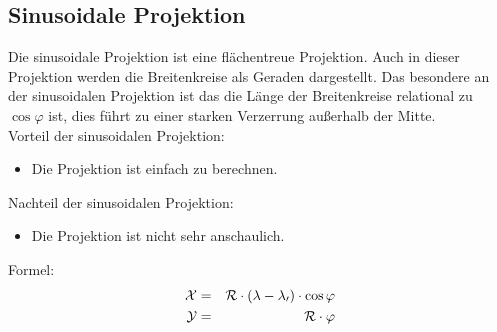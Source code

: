 \subsection{Sinusoidale Projektion}
\label{sec:sinusodial}
Die sinusoidale Projektion ist eine flächentreue Projektion. Auch in dieser Projektion werden die Breitenkreise als Geraden dargestellt. Das besondere an der sinusoidalen Projektion ist das die Länge der Breitenkreise relational zu $\cos\varphi$ ist, dies führt zu einer starken Verzerrung außerhalb der Mitte.\\
Vorteil der sinusoidalen Projektion:\\
\begin{itemize}
\item Die Projektion ist einfach zu berechnen.
\end{itemize}
Nachteil der sinusoidalen Projektion:\\
\begin{itemize}
\item Die Projektion ist nicht sehr anschaulich.
\end{itemize}
Formel:\\
\begin{eqnarray}
\mathcal {X} & = &\cal{R}\cdot(\lambda - \lambda _0)\cdot \cos \varphi \\
\mathcal{Y} & = &\cal{R} \cdot \varphi
\end{eqnarray}
